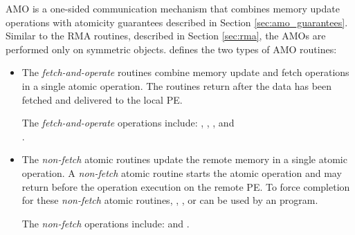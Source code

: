 \ac{AMO} is a one-sided communication mechanism that combines memory update
operations with atomicity guarantees described in Section
\ref{sec:amo_guarantees}.  Similar to the \ac{RMA} routines, described in
Section \ref{sec:rma}, the \acp{AMO} are performed only on symmetric objects.
\openshmem{} defines the two types of \ac{AMO} routines:
\begin{itemize}
\item %
The \textit{fetch-and-operate} routines combine memory update and fetch
operations in a single atomic operation.  The routines return after the data has
been fetched and delivered to the local \ac{PE}.

The \textit{fetch-and-operate} operations include: ,
, , and\\ .

\item %
The \textit{non-fetch} atomic routines update the remote memory in a single
atomic operation.  A \textit{non-fetch} atomic routine starts the atomic
operation and may return before the operation execution on the remote \ac{PE}.
To force completion for these \textit{non-fetch} atomic routines,
, , or  can be
used by an \openshmem{} program. 

The \textit{non-fetch} operations include:  and
.
\end{itemize}
